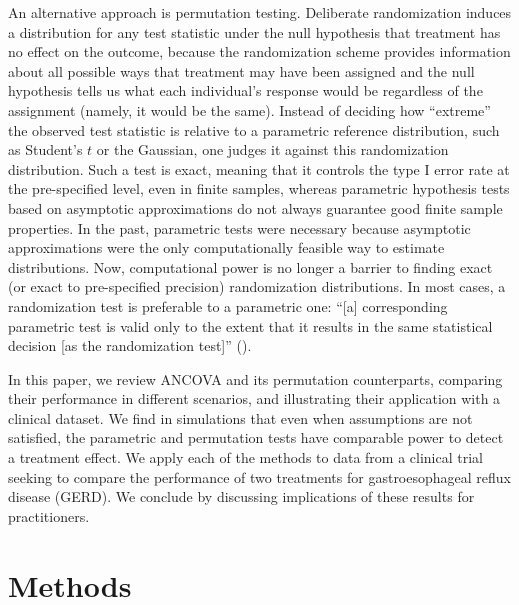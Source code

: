 \documentclass[11pt]{article}
\newcommand{\bit}{\begin{itemize}}
\newcommand{\eit}{\end{itemize}}
\newcommand{\todo}[1]{{\color{red}{TO DO: \sc #1}}}
\begin{document}
An alternative approach is permutation testing.
Deliberate randomization induces a distribution for any test statistic under the null hypothesis that treatment has no effect on the outcome,
because the randomization scheme provides information about all possible ways that treatment may have been assigned 
and the null hypothesis tells us what each individual's response would be regardless of the assignment (namely, it would be the same).
Instead of deciding how ``extreme'' the observed test statistic is relative to a parametric reference distribution, such as Student's $t$ or the Gaussian, one judges it against this randomization distribution.
Such a test is exact, meaning that it controls the type I error rate at the pre-specified level, even in finite samples, whereas parametric hypothesis tests based on asymptotic approximations do not always guarantee good finite sample properties.
In the past, parametric tests were necessary because asymptotic approximations were the only computationally feasible way to estimate distributions. 
Now, computational power is no longer a barrier to finding exact (or exact to pre-specified precision) randomization distributions.
In most cases, a randomization test is preferable to a parametric one:
``[a] corresponding parametric test is valid only to the extent that it results in the same statistical decision [as the randomization test]'' (\cite{bradley_distribution_1968}).

\todo{ lit review: 
\bit 
\item cite the vickers paper
\item what else have people done comparing linear models to permutation/nonparametric tests?
\eit
}

In this paper, we review ANCOVA and its permutation counterparts, comparing their performance in different scenarios, and illustrating their application with a clinical dataset.
We find in simulations that even when assumptions are not satisfied, the parametric and permutation tests have comparable power to detect a treatment effect.
We apply each of the methods to data from a clinical trial seeking to compare the performance of two treatments for gastroesophageal reflux disease (GERD).
We conclude by discussing implications of these results for practitioners.

\section{Methods}
\end{document}
